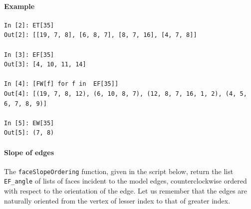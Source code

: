 \documentclass[11pt,oneside]{article}    %
\begin{document}
\paragraph{Example}

{\small
\begin{verbatim}
In [2]: ET[35]
Out[2]: [[19, 7, 8], [6, 8, 7], [8, 7, 16], [4, 7, 8]]

In [3]: EF[35]
Out[3]: [4, 10, 11, 14]

In [4]: [FW[f] for f in  EF[35]]
Out[4]: [(19, 7, 8, 12), (6, 10, 8, 7), (12, 8, 7, 16, 1, 2), (4, 5, 6, 7, 8, 9)]

In [5]: EW[35]
Out[5]: (7, 8)
\end{verbatim}}



\paragraph{Slope of edges}

The \texttt{faceSlopeOrdering} function, given in the script below, return the list \texttt{EF\_angle} of lists of faces incident to the model edges, counterclockwise ordered with respect to the orientation of the edge. Let us remember that the edges are naturally oriented from the vertex of lesser index to that of greater index.
\end{document}
